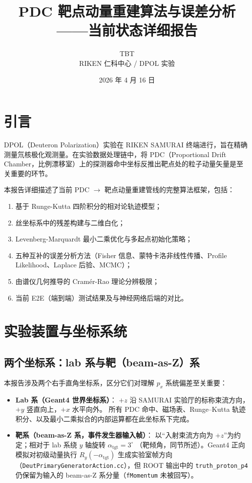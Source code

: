 \documentclass[a4paper, 11pt]{article}
\title{\textbf{PDC 靶点动量重建算法与误差分析\\——当前状态详细报告}}
\author{TBT \\ RIKEN 仁科中心 / DPOL 实验}
\date{2026 年 4 月 16 日}
\begin{document}
\maketitle
\tableofcontents
\newpage

\section{引言}

DPOL（Deuteron Polarization）实验在 RIKEN SAMURAI 终端进行，旨在精确测量氘核极化观测量。在实验数据处理链中，将 PDC（Proportional Drift Chamber，比例漂移室）上的探测器命中坐标反推出靶点处的粒子动量矢量是至关重要的环节。

本报告详细描述了当前 PDC $\to$ 靶点动量重建管线的完整算法框架，包括：
\begin{enumerate}[nosep]
  \item 基于 Runge-Kutta 四阶积分的相对论轨迹模型；
  \item 丝坐标系中的残差构建与二维白化；
  \item Levenberg-Marquardt 最小二乘优化与多起点初始化策略；
  \item 五种互补的误差分析方法（Fisher 信息、蒙特卡洛非线性传播、Profile Likelihood、Laplace 后验、MCMC）；
  \item 由谱仪几何推导的 Cramér-Rao 理论分辨极限；
  \item 当前 E2E（端到端）测试结果及与神经网络后端的对比。
\end{enumerate}

\section{实验装置与坐标系统}

\subsection{两个坐标系：lab 系与靶（beam-as-Z）系}
\label{sec:frame_convention}

本报告涉及两个右手直角坐标系，区分它们对理解 $p_x$ 系统偏差至关重要：

\begin{itemize}
  \item \textbf{Lab 系（Geant4 世界坐标系）}：
    $+z$ 沿 SAMURAI 实验厅的标称束流方向，$+y$ 竖直向上，$+x$ 水平向外。
    所有 PDC 命中、磁场表、Runge--Kutta 轨迹积分、以及最小二乘拟合的内部运算都在此坐标系下完成。
  \item \textbf{靶系（beam-as-Z 系，事件发生器输入帧）}：
    以“入射束流方向为 $+z$”为约定；相对于 lab 系绕 $y$ 轴旋转 $\alpha_\mathrm{tgt} = 3^\circ$
    （靶倾角，同节所述）。Geant4 正向模拟对初级动量执行 $R_y(-\alpha_\mathrm{tgt})$
    生成实验室帧方向（\texttt{DeutPrimaryGeneratorAction.cc}），但 ROOT 输出中的
    \texttt{truth\_proton\_p4} 仍保留为输入的 beam-as-Z 系分量（\texttt{fMomentum} 未被回写）。
\end{itemize}
\end{document}
